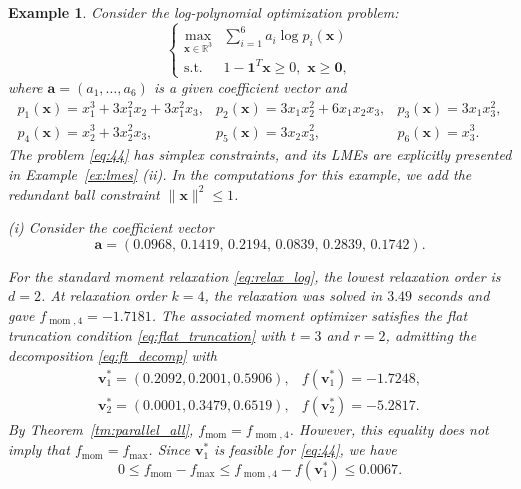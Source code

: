 \documentclass[pdflatex,sn-mathphys-num]{sn-jnl}%
\newcommand{\vect}[1]{\boldsymbol{#1}}
\newcommand{\st}{\mathrm{s.t.}}
\theoremstyle{thmstyleone}%
\theoremstyle{thmstyletwo}%
\newtheorem{example}{Example}%
\theoremstyle{thmstylethree}%
\begin{document}
\begin{example}\label{ex:44}
	Consider the log-polynomial optimization problem:
	\begin{equation}\label{eq:44}
		\left\{\begin{array}{cl}
			\max\limits_{\vect{x} \in \mathbb{R}^3} & \sum\limits_{i=1}^{6} a_i \log  p_i(\vect{x})  \\
			\st & 1 - \mathbf{1}^T \vect{x} \geq 0,\,\, \vect{x} \geq \mathbf{0},
		\end{array}\right.
	\end{equation}
	where $\vect{a} = (a_1,\ldots, a_6)$ is a given coefficient vector and
	\begin{equation*}
		\begin{array}{lll}
			p_1(\vect{x}) = x_1^3 + 3x_1^2x_2 + 3x_1^2 x_3, 
			& p_2(\vect{x}) = 3x_1x_2^2 + 6x_1x_2x_3 , 
			& p_3(\vect{x}) = 3x_1x_3^2,\\
			p_4(\vect{x}) = x_2^3 + 3x_2^2x_3, 
			& p_5(\vect{x}) = 3x_2x_3^2 , 
			& p_6(\vect{x}) = x_3^3 .
		\end{array}
	\end{equation*}
	The problem \eqref{eq:44} has simplex constraints, 
	and its LMEs are explicitly presented in Example~\ref{ex:lmes} (ii).
    In the computations for this example, we add the redundant ball
constraint $\|\vect{x}\|^2\leq 1$.
	
	
	(i) Consider the coefficient vector
	\[
	\vect{a}=
	( 0.0968,\,    0.1419,\,    0.2194,\,    0.0839,\,    0.2839 ,\,   0.1742).
	\]
	
{\color{red}
	For the standard moment relaxation \eqref{eq:relax_log}, the lowest
	relaxation order is $d=2$. At relaxation order $k=4$, the relaxation
	was solved in $3.49$ seconds and gave
	$f_{\operatorname{mom},4}=-1.7181$. The associated moment optimizer
	satisfies the flat truncation condition
	\eqref{eq:flat_truncation} with $t=3$ and $r=2$, admitting the
	decomposition \eqref{eq:ft_decomp} with
	\[
	\begin{array}{ll}
	\vect{v}_1^*=(0.2092,0.2001,0.5906),
	& f(\vect{v}_1^*)=-1.7248,\\
	\vect{v}_2^*=(0.0001,0.3479,0.6519),
	& f(\vect{v}_2^*)=-5.2817.
	\end{array}
	\]
	By Theorem~\ref{tm:parallel_all},
	$f_{\operatorname{mom}}=f_{\operatorname{mom},4}$. However, this
	equality does not imply that
	$f_{\operatorname{mom}}=f_{\max}$. Since $\vect{v}_1^*$ is feasible
	for \eqref{eq:44}, we have
	\[
	0\leq f_{\operatorname{mom}}-f_{\max}
	\leq f_{\operatorname{mom},4}-f(\vect{v}_1^*)
	\leq 0.0067.
	\]

}
\end{example}
\end{document}
